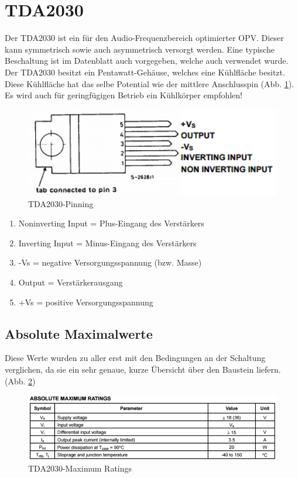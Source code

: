 \section{TDA2030}\label{sec:3.2}
Der TDA2030 ist ein für den Audio-Frequenzbereich optimierter OPV. Dieser kann symmetrisch sowie auch asymmetrisch versorgt werden. Eine typische Beschaltung ist im Datenblatt auch vorgegeben, welche auch verwendet wurde. Der TDA2030 besitzt ein Pentawatt-Gehäuse, welches eine Kühlfläche besitzt. Diese Kühlfläche hat das selbe Potential wie der mittlere Anschlusspin (Abb. \ref{fig:3.2.1}).\\
Es wird auch für geringfügigen Betrieb ein Kühlkörper empfohlen!
\begin{figure} [H]
	\centering
	\includegraphics[width=1\textwidth]{img/Grundlagen/TDA2030/TDA2030Pinning.PNG}
	\caption[TDA2030-Pinning]{TDA2030-Pinning\footnotemark}
	\label {fig:3.2.1}
\end{figure}
\begin{enumerate}
	\item Noninverting Input = Plus-Eingang des Verstärkers
	\item Inverting Input = Minus-Eingang des Verstärkers
	\item -Vs = negative Versorgungsspannung (bzw. Masse)
	\item Output = Verstärkerausgang
	\item +Vs = positive Versorgungsspannung		
\end{enumerate}


\subsection{Absolute Maximalwerte}\label{subsec:3.2.1}
Diese Werte wurden zu aller erst mit den Bedingungen an der Schaltung verglichen, da sie ein sehr genaue, kurze Übersicht über den Baustein liefern. (Abb. \ref{fig:3.2.1.1})
\begin{figure} [H]
	\centering
	\includegraphics[width=1\textwidth]{img/Grundlagen/TDA2030/TDA2030MaximumRatings.PNG}
	\caption[TDA2030-Maximum Ratings]{TDA2030-Maximum Ratings\footnotemark}
	\label {fig:3.2.1.1}
\end{figure}

